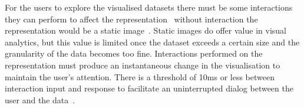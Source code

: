 For the users to explore the visualised datasets there must be some interactions they can perform to affect the representation~\cite{Yi2007} without interaction the representation would be a static image~\cite{Becker1987}.
Static images do offer value in visual analytics, but this value is limited once the dataset exceeds a certain size and the granularity of the data becomes too fine.
Interactions performed on the representation must produce an instantaneous change in the visualisation to maintain the user's attention.
There is a threshold of 10ms or less between interaction input and response to facilitate an uninterrupted dialog between the user and the data~\cite{Glueck2014, Li2016, MacKenzie1993, Muhlbacher2014}.

